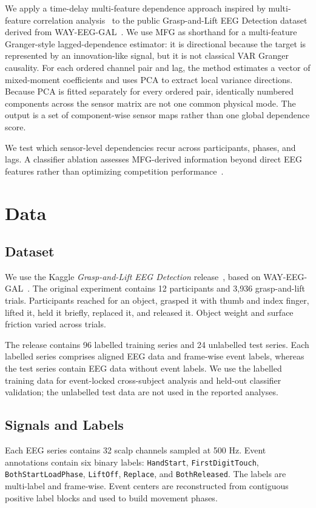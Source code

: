 \documentclass[10pt,journal]{IEEEtran}
\newcommand{\code}[1]{\texttt{#1}}
\begin{document}
We apply a time-delay multi-feature dependence approach inspired by multi-feature correlation analysis~\cite{duda2023timedelay} to the public Grasp-and-Lift EEG Detection dataset derived from WAY-EEG-GAL~\cite{luciw2014wayeeggal,kagglegrasp}. We use MFG as shorthand for a multi-feature Granger-style lagged-dependence estimator: it is directional because the target is represented by an innovation-like signal, but it is not classical VAR Granger causality. For each ordered channel pair and lag, the method estimates a vector of mixed-moment coefficients and uses PCA to extract local variance directions. Because PCA is fitted separately for every ordered pair, identically numbered components across the sensor matrix are not one common physical mode. The output is a set of component-wise sensor maps rather than one global dependence score.

We test which sensor-level dependencies recur across participants, phases, and lags. A classifier ablation assesses MFG-derived information beyond direct EEG features rather than optimizing competition performance~\cite{barachant2015grasp}.

\section{Data}
\subsection{Dataset}
We use the Kaggle \emph{Grasp-and-Lift EEG Detection} release~\cite{kagglegrasp}, based on WAY-EEG-GAL~\cite{luciw2014wayeeggal}. The original experiment contains 12 participants and 3,936 grasp-and-lift trials. Participants reached for an object, grasped it with thumb and index finger, lifted it, held it briefly, replaced it, and released it. Object weight and surface friction varied across trials.

The release contains 96 labelled training series and 24 unlabelled test series. Each labelled series comprises aligned EEG data and frame-wise event labels, whereas the test series contain EEG data without event labels. We use the labelled training data for event-locked cross-subject analysis and held-out classifier validation; the unlabelled test data are not used in the reported analyses.

\subsection{Signals and Labels}
Each EEG series contains 32 scalp channels sampled at 500 Hz. Event annotations contain six binary labels: \code{HandStart}, \code{FirstDigitTouch}, \code{BothStartLoadPhase}, \code{LiftOff}, \code{Replace}, and \code{BothReleased}. The labels are multi-label and frame-wise. Event centers are reconstructed from contiguous positive label blocks and used to build movement phases.
\end{document}
